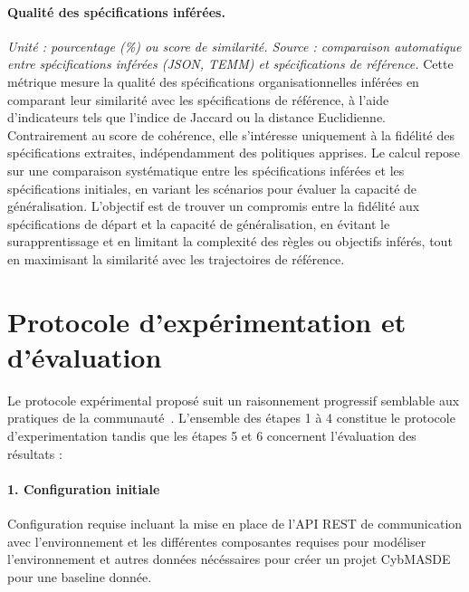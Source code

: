 \paragraph{Qualité des spécifications inférées.}
\textit{Unité : pourcentage (\%) ou score de similarité. Source : comparaison automatique entre spécifications inférées (JSON, TEMM) et spécifications de référence.}
Cette métrique mesure la qualité des spécifications organisationnelles inférées en comparant leur similarité avec les spécifications de référence, à l’aide d’indicateurs tels que l’indice de Jaccard ou la distance Euclidienne. Contrairement au score de cohérence, elle s’intéresse uniquement à la fidélité des spécifications extraites, indépendamment des politiques apprises. Le calcul repose sur une comparaison systématique entre les spécifications inférées et les spécifications initiales, en variant les scénarios pour évaluer la capacité de généralisation. L’objectif est de trouver un compromis entre la fidélité aux spécifications de départ et la capacité de généralisation, en évitant le surapprentissage et en limitant la complexité des règles ou objectifs inférés, tout en maximisant la similarité avec les trajectoires de référence.

\section{Protocole d'expérimentation et d'évaluation}\label{sec:protocole_experimental}

Le protocole expérimental proposé suit un raisonnement progressif semblable aux pratiques de la communauté~\cite{papoudakis2021agent}.
L'ensemble des étapes 1 à 4 constitue le protocole d'experimentation tandis que les étapes 5 et 6 concernent l'évaluation des résultats :

\paragraph{1. Configuration initiale}
Configuration requise incluant la mise en place de l’API REST de communication avec l'environnement et les différentes composantes requises pour modéliser l'environnement et autres données nécéssaires pour créer un projet CybMASDE pour une baseline donnée.

